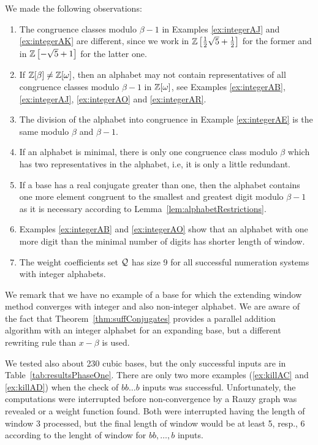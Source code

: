 We made the following observations:
\begin{enumerate}
\item The congruence classes modulo $\beta-1$ in Examples \ref{ex:integerAJ} and \ref{ex:integerAK} are different, since we work in $\mathbb{Z}\left[\frac{1}{2} \sqrt{5} + \frac{1}{2}\right]$ for the former and in $\mathbb{Z}\left[-\sqrt{5} + 1\right]$ for the latter one.
\item If $\mathbb{Z}[\beta]\neq\mathbb{Z}[\omega]$, then an alphabet may not contain representatives of all congruence classes modulo $\beta-1$ in $\mathbb{Z}[\omega]$, see Examples \ref{ex:integerAB},  \ref{ex:integerAJ}, \ref{ex:integerAO} and \ref{ex:integerAR}.
\item The division of the alphabet into congruence in Example \ref{ex:integerAE} is the same modulo $\beta$ and $\beta-1$.
\item If an alphabet is minimal, there is only one congruence class modulo $\beta$ which has two representatives in the alphabet, i.e, it is only a little  redundant.
\item If a base has a real conjugate greater than one, then the alphabet contains one more element congruent to the smallest and greatest digit modulo $\beta-1$ as it is necessary according to Lemma~\ref{lem:alphabetRestrictions}.
\item Examples \ref{ex:integerAB} and \ref{ex:integerAO} show that  an alphabet with one more digit than the minimal number of digits has shorter length of window.
\item The weight coefficients set $\mathcal{Q}$ has size 9 for all successful numeration systems with integer alphabets.
\end{enumerate}


We remark that we have no example of a base for which the extending window method converges with integer and also non-integer alphabet. We are aware of the fact that Theorem~\ref{thm:suffConjugates} provides a parallel addition algorithm with an integer alphabet for an expanding base, but  a different rewriting rule than $x-\beta$ is used.



We tested also about 230 cubic bases, but the only successful inputs are in Table~\ref{tab:resultsPhaseOne}. There are only two more examples (\ref{ex:killAC} and \ref{ex:killAD}) when the check of $bb\dots b$ inputs was successful. Unfortunately, the computations were interrupted before non-convergence by a Rauzy graph was revealed or a weight function found. Both were interrupted having the length of window 3 processed, but the final length of window would be at least 5, resp., 6 according to the lenght of window for $bb,\dots,b$ inputs.








